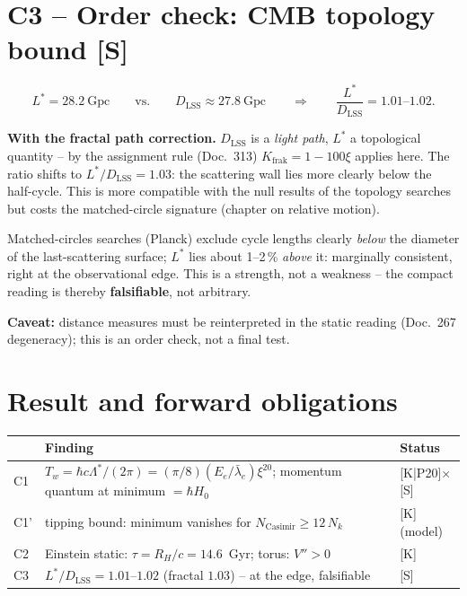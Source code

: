 \section{C3 -- Order check: CMB topology bound [S]}

\begin{equation}
  L^{*} = 28.2~\text{Gpc}
  \qquad\text{vs.}\qquad
  D_\text{LSS} \approx 27.8~\text{Gpc}
  \qquad\Rightarrow\qquad
  \frac{L^{*}}{D_\text{LSS}} = 1.01\text{--}1.02.
\end{equation}

\textbf{With the fractal path correction.} $D_\text{LSS}$ is a
\emph{light path}, $L^{*}$ a topological quantity -- by the
assignment rule (Doc.~313) $K_\text{frak} = 1-100\xi$ applies
here. The ratio shifts to $L^{*}/D_\text{LSS} = 1.03$: the
scattering wall lies more clearly below the half-cycle. This is
more compatible with the null results of the topology searches but
costs the matched-circle signature (chapter on relative motion).

Matched-circles searches (Planck) exclude cycle lengths clearly
\emph{below} the diameter of the last-scattering surface; $L^{*}$
lies about 1--2\,\% \emph{above} it: marginally consistent, right at
the observational edge. This is a strength, not a weakness -- the
compact reading is thereby \textbf{falsifiable}, not arbitrary.

\textbf{Caveat:} distance measures must be reinterpreted in the
static reading (Doc.~267 degeneracy); this is an order check, not a
final test.

\section{Result and forward obligations}

\begin{center}
\begin{tabular}{lp{7.2cm}l}
\toprule
& Finding & Status \\
\midrule
C1 & $T_w = \hbar c\Lambda^{*}/(2\pi) = (\pi/8)(E_e/\bar\lambda_e)\xi^{20}$;
     momentum quantum at minimum $= \hbar H_0$ & [K|P20]$\times$[S] \\
C1' & tipping bound: minimum vanishes for
     $N_\text{Casimir} \ge 12\,N_k$ & [K] (model) \\
C2 & Einstein static: $\tau = R_H/c = 14.6$~Gyr;
     torus: $V'' > 0$ & [K] \\
C3 & $L^{*}/D_\text{LSS} = 1.01$--$1.02$ (fractal $1.03$) -- at the edge,
     falsifiable & [S] \\
\bottomrule
\end{tabular}
\end{center}

